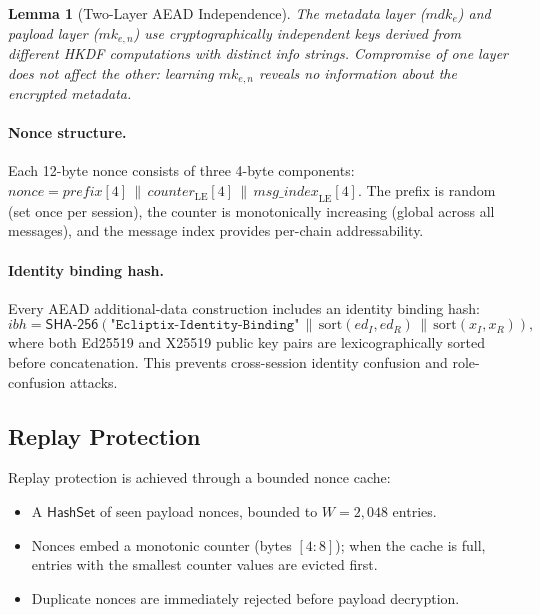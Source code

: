\documentclass[11pt,a4paper]{article}
\newtheorem{lemma}[theorem]{Lemma}
\theoremstyle{definition}
\newcommand{\SHA}{\textsf{SHA-256}}
\newcommand{\concat}{\,\|\,}
\newcommand{\mk}{\mathit{mk}}
\newcommand{\mdk}{\mathit{mdk}}
\begin{document}
\begin{lemma}[Two-Layer AEAD Independence]\label{lem:two-layer}
The metadata layer ($\mdk_e$) and payload layer ($\mk_{e,n}$) use cryptographically independent keys derived from different HKDF computations with distinct info strings. Compromise of one layer does not affect the other: learning $\mk_{e,n}$ reveals no information about the encrypted metadata.
\end{lemma}

\paragraph{Nonce structure.}
Each 12-byte nonce consists of three 4-byte components: $\mathit{nonce} = \mathit{prefix}[4] \concat \mathit{counter}_{\mathrm{LE}}[4] \concat \mathit{msg\_index}_{\mathrm{LE}}[4]$. The prefix is random (set once per session), the counter is monotonically increasing (global across all messages), and the message index provides per-chain addressability.

\paragraph{Identity binding hash.}
Every AEAD additional-data construction includes an identity binding hash:
\[
  \mathit{ibh} = \SHA(\texttt{"Ecliptix-Identity-Binding"} \concat \mathrm{sort}(\mathit{ed}_I, \mathit{ed}_R) \concat \mathrm{sort}(\mathit{x}_I, \mathit{x}_R)),
\]
where both Ed25519 and X25519 public key pairs are lexicographically sorted before concatenation. This prevents cross-session identity confusion and role-confusion attacks.

\subsection{Replay Protection}\label{sec:replay}

Replay protection is achieved through a bounded nonce cache:
\begin{itemize}
  \item A $\mathsf{HashSet}$ of seen payload nonces, bounded to $W = 2{,}048$ entries.
  \item Nonces embed a monotonic counter (bytes $[4{:}8]$); when the cache is full, entries with the smallest counter values are evicted first.
  \item Duplicate nonces are immediately rejected before payload decryption.
\end{itemize}
\end{document}
